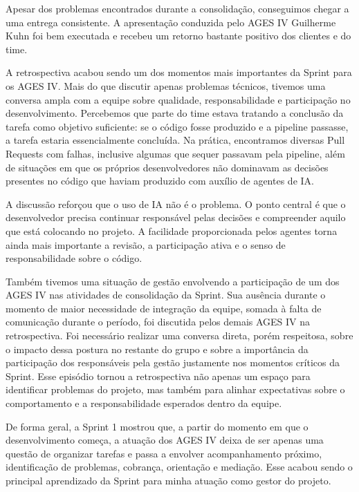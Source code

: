 \indent Apesar dos problemas encontrados durante a consolidação, conseguimos chegar a uma entrega consistente. A apresentação conduzida pelo AGES IV Guilherme Kuhn foi bem executada e recebeu um retorno bastante positivo dos clientes e do time.\par


\indent A retrospectiva acabou sendo um dos momentos mais importantes da Sprint para os AGES IV. Mais do que discutir apenas problemas técnicos, tivemos uma conversa ampla com a equipe sobre qualidade, responsabilidade e participação no desenvolvimento. Percebemos que parte do time estava tratando a conclusão da tarefa como objetivo suficiente: se o código fosse produzido e a pipeline passasse, a tarefa estaria essencialmente concluída. Na prática, encontramos diversas Pull Requests com falhas, inclusive algumas que sequer passavam pela pipeline, além de situações em que os próprios desenvolvedores não dominavam as decisões presentes no código que haviam produzido com auxílio de agentes de IA.\par

\indent A discussão reforçou que o uso de IA não é o problema. O ponto central é que o desenvolvedor precisa continuar responsável pelas decisões e compreender aquilo que está colocando no projeto. A facilidade proporcionada pelos agentes torna ainda mais importante a revisão, a participação ativa e o senso de responsabilidade sobre o código.\par

\indent Também tivemos uma situação de gestão envolvendo a participação de um dos AGES IV nas atividades de consolidação da Sprint. Sua ausência durante o momento de maior necessidade de integração da equipe, somada à falta de comunicação durante o período, foi discutida pelos demais AGES IV na retrospectiva. Foi necessário realizar uma conversa direta, porém respeitosa, sobre o impacto dessa postura no restante do grupo e sobre a importância da participação dos responsáveis pela gestão justamente nos momentos críticos da Sprint. Esse episódio tornou a retrospectiva não apenas um espaço para identificar problemas do projeto, mas também para alinhar expectativas sobre o comportamento e a responsabilidade esperados dentro da equipe.\par

\indent De forma geral, a Sprint 1 mostrou que, a partir do momento em que o desenvolvimento começa, a atuação dos AGES IV deixa de ser apenas uma questão de organizar tarefas e passa a envolver acompanhamento próximo, identificação de problemas, cobrança, orientação e mediação. Esse acabou sendo o principal aprendizado da Sprint para minha atuação como gestor do projeto.\par

